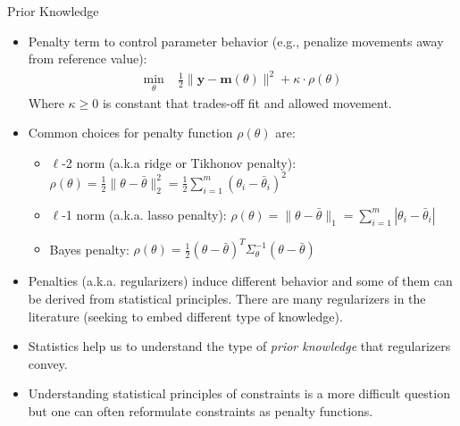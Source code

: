 \documentclass[9pt]{beamer}
\begin{document}
%
\begin{frame}{Prior Knowledge}

\begin{itemize}
\item Penalty term to control parameter behavior (e.g., penalize movements away from reference value):
\begin{align*}
\min_{\theta}& \; \frac{1}{2}\|\mathbf{y}- \mathbf{m}(\theta)\|^2+\kappa\cdot  \rho(\theta)
\end{align*}
Where $\kappa\geq 0$ is constant that trades-off fit and allowed movement. 
\item Common choices for penalty function $\rho(\theta)$ are:
\begin{itemize}
\item  $\ell$-2 norm (a.k.a ridge or Tikhonov penalty): $\rho(\theta)=\frac{1}{2}\|\theta-\bar{\theta}\|_2^2=\frac{1}{2}\sum_{i=1}^m(\theta_i-\bar{\theta}_i)^2$
\item $\ell$-1 norm (a.k.a. lasso penalty): $\rho(\theta)=\|\theta-\bar{\theta}\|_1=\sum_{i=1}^m
|\theta_i-\bar{\theta}_i|$
\item Bayes penalty: $\rho(\theta)=\frac{1}{2}(\theta-\bar{\theta})^T\Sigma_\theta^{-1} (\theta -\bar{\theta})$
\end{itemize}
\item Penalties  (a.k.a. regularizers) induce different behavior and some of them can be derived from statistical principles. There are many regularizers in the literature (seeking to embed different type of knowledge).
\item Statistics help us to understand the type of {\em prior knowledge} that regularizers convey. 
\item Understanding statistical principles of constraints is a more difficult question but one can often reformulate constraints as penalty functions. 
\end{itemize}

\end{frame}
\end{document}
